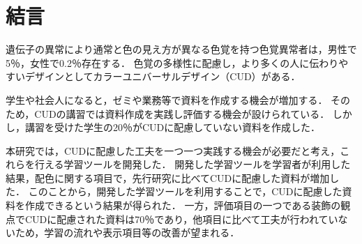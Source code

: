 \section{結言}
遺伝子の異常により通常と色の見え方が異なる色覚を持つ色覚異常者は，男性で5％，女性で0.2％存在する．
色覚の多様性に配慮し，より多くの人に伝わりやすいデザインとしてカラーユニバーサルデザイン（CUD）がある．

学生や社会人になると，ゼミや業務等で資料を作成する機会が増加する．
そのため，CUDの講習では資料作成を実践し評価する機会が設けられている．
しかし，講習を受けた学生の20％がCUDに配慮していない資料を作成した．

本研究では，CUDに配慮した工夫を一つ一つ実践する機会が必要だと考え，これらを行える学習ツールを開発した．
開発した学習ツールを学習者が利用した結果，配色に関する項目で，先行研究に比べてCUDに配慮した資料が増加した．
このことから，開発した学習ツールを利用することで，CUDに配慮した資料を作成できるという結果が得られた．
一方，評価項目の一つである装飾の観点でCUDに配慮された資料は70％であり，他項目に比べて工夫が行われていないため，学習の流れや表示項目等の改善が望まれる．